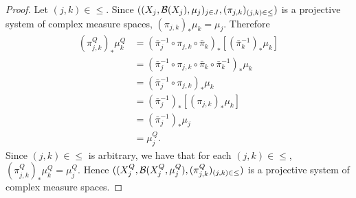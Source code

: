 \documentclass{book}
\begin{document}
	\begin{proof}
		Let $(j,k) \in {\leq}$. Since $((X_j, \mathcal{B}(X_j), \mu_j)_{j \in J}, (\pi_{j,k})_{(j,k) \in {\leq}})$ is a projective system of complex measure spaces, $(\pi_{j,k})_* \mu_k = \mu_j$. Therefore
		\begin{align*}
			(\pi^Q_{j,k})_*\mu^Q_k
			& = (\bar{\pi}_j^{-1} \circ \pi_{j,k} \circ \bar{\pi}_k)_*[(\bar{\pi}_k^{-1})_*\mu_k] \\
			& = (\bar{\pi}_j^{-1} \circ \pi_{j,k} \circ \bar{\pi}_k \circ \bar{\pi}_k^{-1})_*\mu_k \\
			& = (\bar{\pi}_j^{-1} \circ \pi_{j,k})_* \mu_k \\
			& = (\bar{\pi}_j^{-1})_*[(\pi_{j,k})_* \mu_k] \\
			& = (\bar{\pi}_j^{-1})_* \mu_j \\
			& = \mu^Q_j.
		\end{align*}
		Since $(j,k) \in {\leq}$ is arbitrary, we have that for each $(j,k) \in {\leq}$, $(\pi^Q_{j,k})_*\mu^Q_k = \mu^Q_j$. Hence $((X^Q_j, \mathcal{B}(X^Q_j, \mu^Q_j), (\pi^Q_{j,k})_{(j,k) \in {\leq}})$ is a  projective system of complex measure spaces.
	\end{proof}
	
\end{document}
